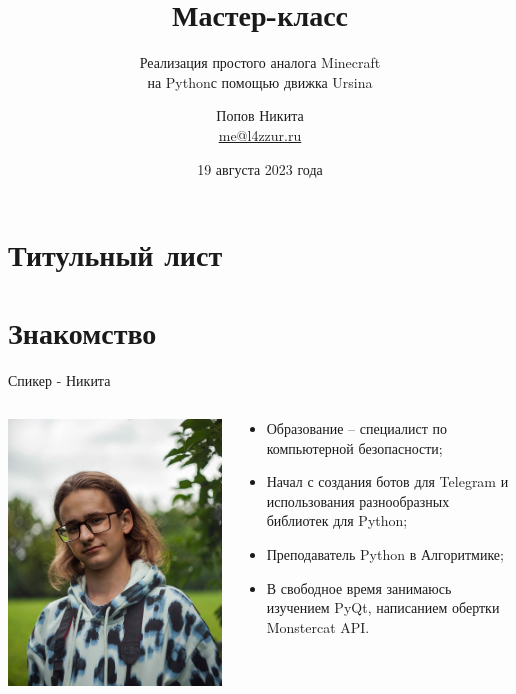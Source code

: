 \documentclass[handout]{beamer}
\title{Мастер-класс}
\subtitle{Реализация простого аналога Minecraft\\на Pythonс помощью движка Ursina}
\author{Попов Никита \\ \href{mailto:me@l4zzur.ru}{me@l4zzur.ru}}
\institute{Международная школа программирования и математики Алгоритмика}
\date{19 августа 2023 года}
\begin{document}
    \section{Титульный лист}
    \begin{frame}
        \titlepage
    \end{frame}

    \section{Знакомство}
    \begin{frame}{Спикер - Никита}
        \begin{columns}
            \begin{column}{0.4\textwidth}
                \includegraphics[width=\textwidth]{img/me.png}
            \end{column}
            \begin{column}{0.6\textwidth}
                \begin{itemize}
                    \item Образование – специалист по компьютерной безопасности;
                    \item Начал с создания ботов для Telegram и использования разнообразных библиотек для Python;
                    \item Преподаватель Python в Алгоритмике;
                    \item В свободное время занимаюсь изучением PyQt, написанием обертки Monstercat API.
                \end{itemize}
            \end{column}
        \end{columns}
    \end{frame}
\end{document}
